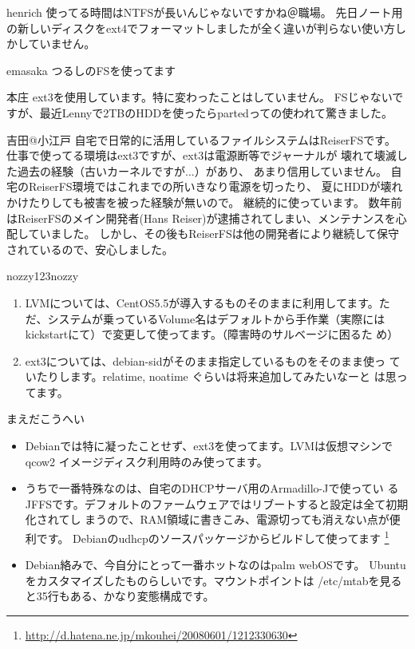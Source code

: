 \begin{prework}{ henrich }
使ってる時間はNTFSが長いんじゃないですかね＠職場。
先日ノート用の新しいディスクをext4でフォーマットしましたが全く違いが判らない使い方しかしていません。
\end{prework}

\begin{prework}{ emasaka }
つるしのFSを使ってます
\end{prework}

\begin{prework}{ 本庄 }
ext3を使用しています。特に変わったことはしていません。
FSじゃないですが、最近Lennyで2TBのHDDを使ったらpartedっての使われて驚きました。
\end{prework}

\begin{prework}{ 吉田@小江戸 }
自宅で日常的に活用しているファイルシステムはReiserFSです。
仕事で使ってる環境はext3ですが、ext3は電源断等でジャーナルが
壊れて壊滅した過去の経験（古いカーネルですが...）があり、
あまり信用していません。
自宅のReiserFS環境ではこれまでの所いきなり電源を切ったり、
夏にHDDが壊れかけたりしても被害を被った経験が無いので。
継続的に使っています。
数年前はReiserFSのメイン開発者(Hans Reiser)が逮捕されてしまい、メンテナンスを心配していました。
しかし、その後もReiserFSは他の開発者により継続して保守されているので、安心しました。
\end{prework}

\begin{prework}{ nozzy123nozzy }
\begin{enumerate}
 \item LVMについては、CentOS5.5が導入するものそのままに利用してます。た
       だ、システムが乗っているVolume名はデフォルトから手作業（実際には
       kickstartにて）で変更して使ってます。（障害時のサルベージに困るた
       め）
\item ext3については、debian-sidがそのまま指定しているものをそのまま使っ
      ていたりします。relatime, noatime ぐらいは将来追加してみたいなーと
      は思ってます。
\end{enumerate}
\end{prework}

\begin{prework}{ まえだこうへい }
\begin{itemize}
 \item Debianでは特に凝ったことせず、ext3を使ってます。LVMは仮想マシンでqcow2
       イメージディスク利用時のみ使ってます。
 \item うちで一番特殊なのは、自宅のDHCPサーバ用のArmadillo-Jで使ってい
       るJFFSです。デフォルトのファームウェアではリブートすると設定は全て初期化されてし
       まうので、RAM領域に書きこみ、電源切っても消えない点が便利です。
       Debianのudhcpのソースパッケージからビルドして使ってます
       \footnote{\url{http://d.hatena.ne.jp/mkouhei/20080601/1212330630}}
 \item Debian絡みで、今自分にとって一番ホットなのはpalm webOSです。
       Ubuntuをカスタマイズしたものらしいです。マウントポイントは
       /etc/mtabを見ると35行もある、かなり変態構成です。
\end{itemize}
\end{prework}

